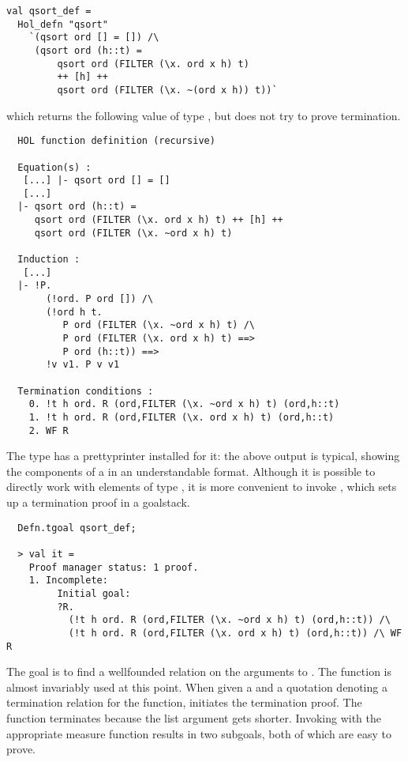 \setcounter{sessioncount}{0}
\begin{session}
\begin{hol}
\begin{verbatim}
val qsort_def =
  Hol_defn "qsort"
    `(qsort ord [] = []) /\
     (qsort ord (h::t) =
         qsort ord (FILTER (\x. ord x h) t) 
         ++ [h] ++ 
         qsort ord (FILTER (\x. ~(ord x h)) t))`
\end{verbatim}
\end{hol}
\end{session}
which returns the following value of type , but does not try 
to prove termination. 
\begin{session}
\begin{hol}
\begin{verbatim}
  HOL function definition (recursive)
    
  Equation(s) :
   [...] |- qsort ord [] = []
   [...]
  |- qsort ord (h::t) =
     qsort ord (FILTER (\x. ord x h) t) ++ [h] ++
     qsort ord (FILTER (\x. ~ord x h) t)
    
  Induction :
   [...]
  |- !P.
       (!ord. P ord []) /\
       (!ord h t.
          P ord (FILTER (\x. ~ord x h) t) /\
          P ord (FILTER (\x. ord x h) t) ==>
          P ord (h::t)) ==>
       !v v1. P v v1
    
  Termination conditions :
    0. !t h ord. R (ord,FILTER (\x. ~ord x h) t) (ord,h::t)
    1. !t h ord. R (ord,FILTER (\x. ord x h) t) (ord,h::t)
    2. WF R
\end{verbatim}
\end{hol}
\end{session}

The type  has a prettyprinter installed for it: the above
output is typical, showing the components of a  in an understandable
format. Although it is possible to directly work with elements of
type \ml{defn}, it is more convenient to invoke 
\ml{Defn.tgoal}, which sets up a termination proof in a goalstack. 
%
\begin{session}
\begin{hol}
\begin{verbatim}
  Defn.tgoal qsort_def;

  > val it =
    Proof manager status: 1 proof.
    1. Incomplete:
         Initial goal:
         ?R.
           (!t h ord. R (ord,FILTER (\x. ~ord x h) t) (ord,h::t)) /\
           (!t h ord. R (ord,FILTER (\x. ord x h) t) (ord,h::t)) /\ WF R
\end{verbatim}
\end{hol}
\end{session}
%
The goal is to find a wellfounded relation on the arguments to .
The function  is almost invariably used at this point.
When given a  and a quotation denoting a termination relation
for the function,  initiates the termination proof.
The \ml{qsort} function terminates because the list argument gets
shorter. Invoking \ml{WF\_REL\_TAC} with the appropriate measure 
function results in two subgoals, both of which are easy to
prove.

